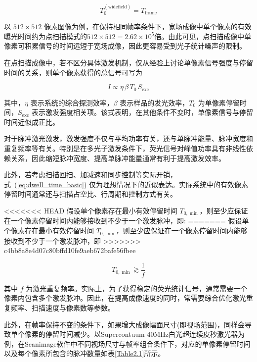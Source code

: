 \begin{equation}
T_0^{(\mathrm{widefield})}=T_{\mathrm{frame}}
\label{eq:widefield_exposure}
\end{equation}

以 $512\times512$ 像素图像为例，在保持相同帧率条件下，宽场成像中单个像素的有效曝光时间约为点扫描模式的$512\times512=2.62\times10^{5}$倍。由此可见，点扫描成像中单像素可积累信号的时间远短于宽场成像，因此更容易受到光子统计噪声的限制。

在点扫描成像中，若不区分具体激发机制，仅从经验上讨论单像素信号强度与停留时间的关系，则单个像素获得的总信号可写为

\begin{equation}
I \propto \eta \,\beta \,T_0\, S_{\mathrm{exc}}
\label{eq:signal_general}
\end{equation}

其中，$\eta$ 表示系统的综合探测效率，$\beta$ 表示样品的发光效率，$T_0$ 为单像素停留时间，$S_{\mathrm{exc}}$ 表示激发强度相关项。该式表明，在其他条件不变时，单像素信号与停留时间近似成正比。

对于脉冲激光激发，激发强度不仅与平均功率有关，还与单脉冲能量、脉冲宽度和重复频率等有关。特别是在多光子激发条件下，荧光信号对峰值功率具有非线性依赖关系，因此缩短脉冲宽度、提高单脉冲能量通常有利于提高激发效率。

此外，若考虑扫描回扫、加减速和同步控制等实际开销，式~(\ref{eq:dwell_time_basic}) 仅为理想情况下的近似表达。实际系统中的有效像素停留时间通常还与扫描占空比、行周期和控制方式有关。

<<<<<<< HEAD
假设单个像素存在最小有效停留时间 $T_{0,\min}$，则至少应保证在一个像素停留时间内能够接收到不少于一个激发脉冲，即:
=======
假设单个像素存在最小有效停留时间 $T_{0,\min}$，则至少应保证在一个像素停留时间内能够接收到不少于一个激发脉冲，即
>>>>>>> c4bb8a8e4d07c80bffd10fe9aeb672bafe56fbee

\begin{equation}
T_{0,\min}\gtrsim \frac{1}{f}
\label{eq:min_dwell_time}
\end{equation}

其中 $f$ 为激光重复频率。实际上，为了获得稳定的荧光统计信号，通常需要一个像素内包含多个激发脉冲。因此，在提高成像速度的同时，常需要综合优化激光重复频率、扫描速度与像素数等参数。

此外，在帧率保持不变的条件下，如果增大成像幅面尺寸(即视场范围)，同样会导致单个像素的停留时间减少。以Supercontuum 40MHz白光超连续皮秒激光器为例，在Scanimage软件中不同视场尺寸与帧率组合条件下，对应的单像素停留时间以及每个像素所包含的脉冲数量如表\ref{Table2.1}所示。

